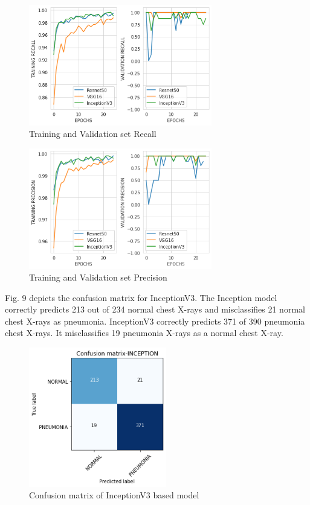 \documentclass[conference]{IEEEtran}
\begin{document}
\begin{figure}
\centering
 \vspace{\floatsep}
\includegraphics[width=8cm]{recall.png}
\caption{Training and Validation set Recall}
\label{fig:cenario}
\end{figure}
\begin{figure}
\centering
 \vspace{\floatsep}
\includegraphics[width=8cm]{precision.png}
\caption{Training and Validation set Precision}
\label{fig:cenario}
\end{figure}
 
Fig. 9 depicts the confusion matrix for InceptionV3. The Inception model correctly predicts 213 out of  234 normal chest X-rays and misclassifies 21 normal chest X-rays as pneumonia. InceptionV3 correctly predicts 371 of 390 pneumonia chest X-rays. It misclassifies 19 pneumonia X-rays as a normal chest X-ray.


\begin{figure}
\centering
 \vspace{\floatsep}
\includegraphics[width=6cm]{CMINCEP.png}
\caption{Confusion matrix  of InceptionV3  based model}
\label{fig:cenario}
\end{figure}
\end{document}
